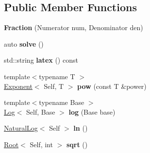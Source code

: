 \subsection*{\-Public \-Member \-Functions}
\begin{DoxyCompactItemize}
\item 
\hypertarget{classlatex_1_1math_1_1Fraction_a918d5b152e5a9d64ceef2fab72735b7d}{{\bfseries \-Fraction} (\-Numerator num, \-Denominator den)}\label{classlatex_1_1math_1_1Fraction_a918d5b152e5a9d64ceef2fab72735b7d}

\item 
\hypertarget{classlatex_1_1math_1_1Fraction_ae52063de20af5ed06ca48daf91567f99}{auto {\bfseries solve} ()}\label{classlatex_1_1math_1_1Fraction_ae52063de20af5ed06ca48daf91567f99}

\item 
\hypertarget{classlatex_1_1math_1_1Fraction_a883e6d0c069e6c2b5c80e36152f0dbd0}{std\-::string {\bfseries latex} () const }\label{classlatex_1_1math_1_1Fraction_a883e6d0c069e6c2b5c80e36152f0dbd0}

\item 
\hypertarget{classlatex_1_1math_1_1Fraction_aeaf23ab636e333adb15371ac9c75faf9}{{\footnotesize template$<$typename T $>$ }\\\hyperlink{classlatex_1_1math_1_1Exponent}{\-Exponent}$<$ \-Self, \-T $>$ {\bfseries pow} (const \-T \&power)}\label{classlatex_1_1math_1_1Fraction_aeaf23ab636e333adb15371ac9c75faf9}

\item 
\hypertarget{classlatex_1_1math_1_1Fraction_ae1793fb2f3d2f84d50a5971ca60ed923}{{\footnotesize template$<$typename Base $>$ }\\\hyperlink{classlatex_1_1math_1_1Log}{\-Log}$<$ \-Self, \-Base $>$ {\bfseries log} (\-Base base)}\label{classlatex_1_1math_1_1Fraction_ae1793fb2f3d2f84d50a5971ca60ed923}

\item 
\hypertarget{classlatex_1_1math_1_1Fraction_af148c418e85b7ed1dad724b7d72ac469}{\hyperlink{classlatex_1_1math_1_1NaturalLog}{\-Natural\-Log}$<$ \-Self $>$ {\bfseries ln} ()}\label{classlatex_1_1math_1_1Fraction_af148c418e85b7ed1dad724b7d72ac469}

\item 
\hypertarget{classlatex_1_1math_1_1Fraction_a72dec9c4ae9613df01215c3cdf8224fe}{\hyperlink{classlatex_1_1math_1_1Root}{\-Root}$<$ \-Self, int $>$ {\bfseries sqrt} ()}\label{classlatex_1_1math_1_1Fraction_a72dec9c4ae9613df01215c3cdf8224fe}

\end{DoxyCompactItemize}
